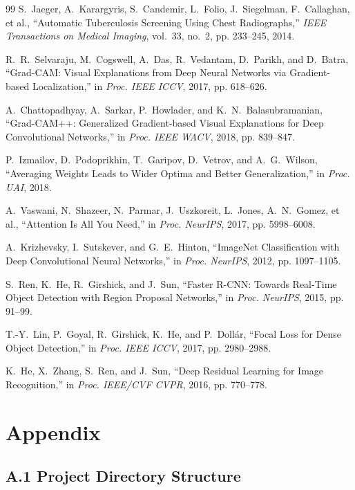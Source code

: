 \documentclass[12pt]{report}
\begin{document}
\begin{thebibliography}{99}
S.~Jaeger, A.~Karargyris, S.~Candemir, L.~Folio, J.~Siegelman, F.~Callaghan, et al., ``Automatic Tuberculosis Screening Using Chest Radiographs,'' \emph{IEEE Transactions on Medical Imaging}, vol.~33, no.~2, pp. 233--245, 2014.

R.~R.~Selvaraju, M.~Cogswell, A.~Das, R.~Vedantam, D.~Parikh, and D.~Batra, ``Grad-CAM: Visual Explanations from Deep Neural Networks via Gradient-based Localization,'' in \emph{Proc. IEEE ICCV}, 2017, pp. 618--626.

A.~Chattopadhyay, A.~Sarkar, P.~Howlader, and K.~N.~Balasubramanian, ``Grad-CAM++: Generalized Gradient-based Visual Explanations for Deep Convolutional Networks,'' in \emph{Proc. IEEE WACV}, 2018, pp. 839--847.

P.~Izmailov, D.~Podoprikhin, T.~Garipov, D.~Vetrov, and A.~G.~Wilson, ``Averaging Weights Leads to Wider Optima and Better Generalization,'' in \emph{Proc. UAI}, 2018.

A.~Vaswani, N.~Shazeer, N.~Parmar, J.~Uszkoreit, L.~Jones, A.~N.~Gomez, et al., ``Attention Is All You Need,'' in \emph{Proc. NeurIPS}, 2017, pp. 5998--6008.

A.~Krizhevsky, I.~Sutskever, and G.~E.~Hinton, ``ImageNet Classification with Deep Convolutional Neural Networks,'' in \emph{Proc. NeurIPS}, 2012, pp. 1097--1105.

S.~Ren, K.~He, R.~Girshick, and J.~Sun, ``Faster R-CNN: Towards Real-Time Object Detection with Region Proposal Networks,'' in \emph{Proc. NeurIPS}, 2015, pp. 91--99.

T.-Y.~Lin, P.~Goyal, R.~Girshick, K.~He, and P.~Doll\'{a}r, ``Focal Loss for Dense Object Detection,'' in \emph{Proc. IEEE ICCV}, 2017, pp. 2980--2988.

K.~He, X.~Zhang, S.~Ren, and J.~Sun, ``Deep Residual Learning for Image Recognition,'' in \emph{Proc. IEEE/CVF CVPR}, 2016, pp. 770--778.

\end{thebibliography}

\appendix
\chapter{Appendix}

\section*{A.1 Project Directory Structure}
\end{document}
